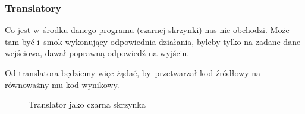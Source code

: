 \documentclass[10pt,t]{beamer}
\begin{document}
\begin{frame}
  \frametitle{Translatory}


  Co jest w~środku danego programu (czarnej skrzynki) nas nie obchodzi.
  Może tam być i~smok wykonujący odpowiednia działania, byleby tylko
  na zadane dane wejściowa, dawał poprawną odpowiedź na wyjściu.

  Od translatora będziemy więc żądać, by~przetwarzał kod źródłowy
  na równoważny mu kod wynikowy.





  \begin{figure}

    \label{fig:Translator-04}



    \caption{Translator jako czarna skrzynka}


  \end{figure}

\end{frame}
\end{document}
